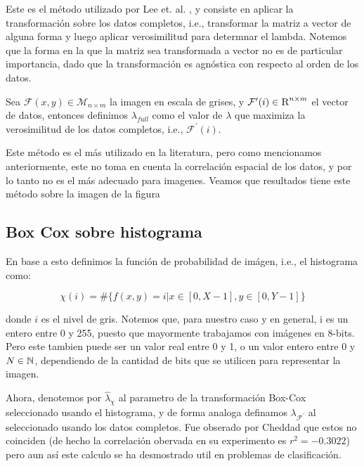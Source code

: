     Este es el m\'etodo utilizado por Lee et. al. \cite{lee2009mr}, y consiste en aplicar la transformaci\'on sobre los datos completos, i.e., transformar la matriz a vector de alguna forma y luego aplicar verosimilitud para determnar el lambda. Notemos que la forma en la que la matriz sea transformada a vector no es de particular importancia, dado que la transformaci\'on es agn\'ostica con respecto al orden de los datos. 

    \begin{defn}
        Sea $\mathcal{F}(x, y)\in\mathcal{M}_{n\times m}$ la imagen en escala de grises, y $\mathcal{F}^{\prime}(i)\in\textsc{R}^{n\times m}$ el vector de datos, entonces definimos $\lambda_{full}$ como el valor de $\lambda$ que maximiza la verosimilitud de los datos completos, i.e., $\mathcal{F}^{\prime}(i)$.
    \end{defn}
    
    Este m\'etodo es el m\'as utilizado en la literatura, pero como mencionamos anteriormente, este no toma en cuenta la correlaci\'on espacial de los datos, y por lo tanto no es el m\'as adecuado para imagenes. Veamos que resultados tiene este m\'etodo sobre la imagen de la figura 

    

    \subsection[short]{Box Cox sobre histograma}

    En base a esto definimos la funci\'on de probabilidad de im\'agen, i.e., el histograma como:
    
    $$\chi(i)= \# \{f(x,y)=i | x\in[0,X-1], y\in[0,Y-1] \}$$ 

    donde $i$ es el nivel de gris. Notemos que, para nuestro caso y en general, i es un entero entre 0 y 255, puesto que mayormente trabajamos con im\'agenes en 8-bits. Pero este tambien puede ser un valor real entre 0 y 1, o un valor entero entre 0 y $N\in\mathbb{N}$, dependiendo de la cantidad de bits que se utilicen para representar la imagen.
    
    Ahora, denotemos por $\hat{\lambda}_{\chi}$ al parametro de la transformaci\'on Box-Cox seleccionado usando el histograma, y de forma analoga definamos $\lambda_{\mathcal{F}^{\prime}}$ al seleccionado usando los datos completos. Fue obserado por Cheddad que estos no coinciden (de hecho la correlaci\'on obervada en su experimento es $r^2=-0.3022$) pero aun as\'i este calculo se ha desmostrado util en problemas de clasificaci\'on.
    

